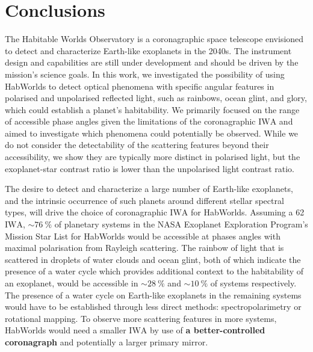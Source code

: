 \documentclass[usenatbib]{mnras}
\newcommand{\IWA}{\ensuremath{\mathrm{IWA}}\xspace}
\newcommand{\HWO}{HabWorlds\xspace}
\begin{document}
\vspace{-2mm}
\section{Conclusions}
\label{sec:5}

The Habitable Worlds Observatory is a coronagraphic space telescope envisioned to detect and characterize Earth-like exoplanets in the 2040s. 
%
The instrument design and capabilities are still under development and should be driven by the mission's science goals.
%
In this work, we investigated the possibility of using \HWO to detect optical phenomena with specific angular features in polarised and unpolarised reflected light, such as rainbows, ocean glint, and glory, which could establish a planet's habitability. 
%
We primarily focused on the range of accessible phase angles given the limitations of the coronagraphic \IWA and aimed to investigate which phenomena could potentially be observed.
%
While we do not consider the detectability of the scattering features beyond their accessibility, we show they are typically more distinct in polarised light, but the exoplanet-star contrast ratio is lower than the unpolarised light contrast ratio.
%

The desire to detect and characterize a large number of Earth-like exoplanets, and the intrinsic occurrence of such planets around different stellar spectral types, will drive the choice of coronagraphic \IWA for \HWO. 
%
Assuming a \qty{62}{\mas} \IWA, $\sim\qty{76}{\percent}$ of planetary systems in the NASA Exoplanet Exploration Program's Mission Star List for \HWO would be accessible at phases angles with maximal polarisation from Rayleigh scattering.
%
The rainbow of light that is scattered in droplets of water clouds and ocean glint, both of which indicate the presence of a water cycle which provides additional context to the habitability of an exoplanet, would be accessible in $\sim\qty{28}{\percent}$ and $\sim\qty{10}{\percent}$ of systems respectively.
%
The presence of a water cycle on Earth-like exoplanets in the remaining systems would have to be established through less direct methods: spectropolarimetry or rotational mapping.
%
To observe more scattering features in more systems, \HWO would need a smaller \IWA by use of {\bf a better-controlled coronagraph} and potentially a larger primary mirror.
\end{document}

